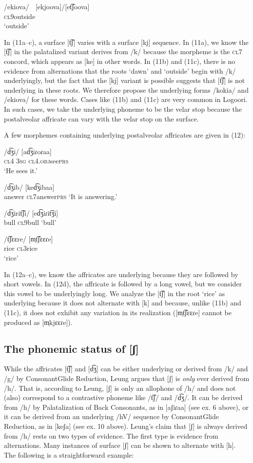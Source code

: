\documentclass[output=paper]{langsci/langscibook}
\begin{document}
\ea{}
 /ekiova/    [ekjoova]/[et͡ʃoova]\\{}
\textsc{cl9}outside\\{}
\glt ‘outside’
\z

In (11a–c), a surface [t͡ʃ] varies with a surface [kj] sequence. In (11a), we know the [t͡ʃ] in the palatalized variant derives from /k/ because the morpheme is the \textsc{cl}7 concord, which appears as [ke] in other words. In (11b) and (11c), there is no evidence from alternations that the roots ‘dawn’ and ‘outside’ begin with /k/ underlyingly, but the fact that the [kj] variant is possible suggests that [t͡ʃ] is not underlying in these roots. We therefore propose the underlying forms /kokia/ and /ekiova/ for these words. Cases like (11b) and (11c) are very common in Logoori. In such cases, we take the underlying phoneme to be the velar stop because the postalveolar affricate can vary with the velar stop on the surface. 

A few morphemes containing underlying postalveolar affricates are given in (12):

\ea{}
 /d͡ʒi/  [ad͡ʒiɾoɾaa]\\{}
\textsc{cl4  3sg cl4.obj}see\textsc{prs}\\{}
\glt ‘He sees it.’
\z

\ea{}
 /d͡ʒib/  [ked͡ʒibaa]\\{}
answer  \textsc{cl7}answer\textsc{prs}
\glt ‘It is answering.’
\z

\ea{}
 /d͡ʒirit͡ʃi/  [ed͡ʒiɾit͡ʒi]\\{}
bull  \textsc{cl9}bull
    ‘bull’
\z

\ea{}
 /t͡ʃɛɛre/  [m̩t͡ʃɛɛɾe]\\{}
rice  \textsc{cl3}rice\\{}
\glt    ‘rice’
\z


In (12a–c), we know the affricates are underlying because they are followed by short vowels. In (12d), the affricate is followed by a long vowel, but we consider this vowel to be underlyingly long. We analyze the [t͡ʃ] in the root ‘rice’ as underlying because it does not alternate with [k] and because, unlike (11b) and (11c), it does not exhibit any variation in its realization ([m̩t͡ʃɛɛɾe] cannot be produced as [m̩kjɛɛɾe]).

\subsection{The phonemic status of [ʃ]} %

While the affricates [t͡ʃ] and [d͡ʒ] can be either underlying or derived from /k/ and /g/ by ConsonantGlide Reduction, Leung argues that [ʃ] is \textit{only} ever derived from /h/. That is, according to Leung, [ʃ] is only an allophone of /h/ and does not (also) correspond to a contrastive phoneme like /t͡ʃ/ and /d͡ʒ/. It can be derived from /h/ by Palatalization of Back Consonants, as in [aʃiɾaa] (see ex. 6 above), or it can be derived from an underlying /hV/ sequence by ConsonantGlide Reduction, as in [keʃa] (see ex. 10 above). Leung’s claim that [ʃ] is always derived from /h/ rests on two types of evidence. The first type is evidence from alternations. Many instances of surface [ʃ] can be shown to alternate with [h]. The following is a straightforward example:
\end{document}
